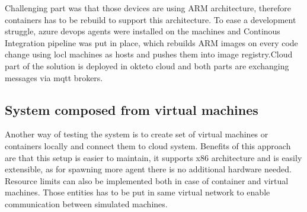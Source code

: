 Challenging part was that those devices are using ARM architecture, therefore containers has to be rebuild to support this architecture. To ease a development struggle, azure devops agents were installed on the machines and Continous Integration pipeline was put in place, which rebuilds ARM images on every code change using locl machines as hosts and pushes them into image registry.Cloud part of the solution is deployed in okteto cloud and both parts are exchanging messages via mqtt brokers.

\subsection{System composed from virtual machines}
Another way of testing the system is to create set of virtual machines or containers locally and connect them to cloud system. Benefits of this approach are that this setup is easier to maintain, it supports x86 architecture and is easily extensible, as for spawning more agent there is no additional hardware needed. Resource limits can also be implemented both in case of container and virtual machines. Those entities has to be put in same virtual network to enable communication between simulated machines.